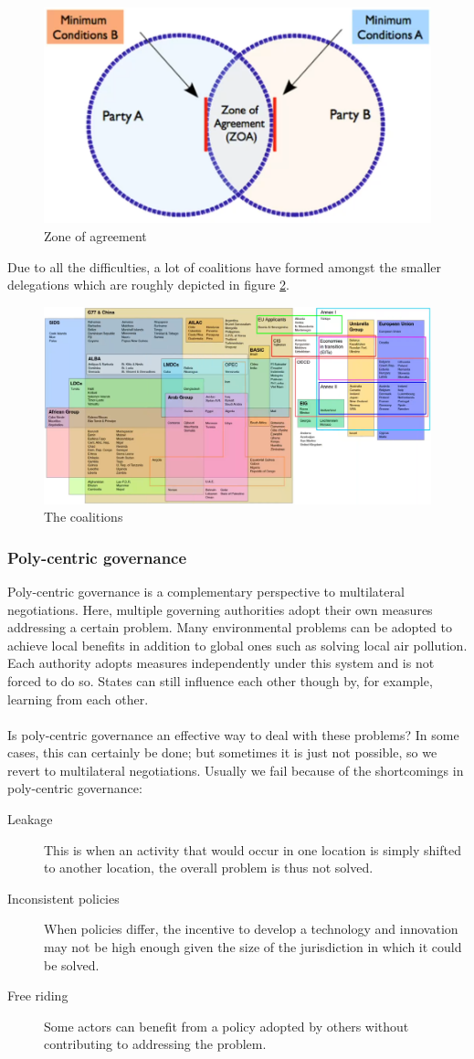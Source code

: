 \documentclass[../summary.tex]{subfiles}
\begin{document}
			\begin{figure}[h]
				\centering
				\includegraphics[width=0.4\linewidth]{../images/13-ZOA.png}
				\caption{Zone of agreement}
				\label{fig:13-ZOA}
			\end{figure}
			Due to all the difficulties, a lot of coalitions have formed amongst the smaller delegations which are roughly depicted in figure \ref{fig:13-coalitions}.
			\begin{figure}[h]
				\centering
				\includegraphics[width=0.7\linewidth]{../images/13-coalitions.png}
				\caption{The coalitions}
				\label{fig:13-coalitions}
			\end{figure}
		
		\subsubsection{Poly-centric governance}
			Poly-centric governance is a complementary perspective to multilateral negotiations. Here, multiple governing authorities adopt their own measures addressing a certain problem. Many environmental problems can be adopted to achieve local benefits in addition to global ones such as solving local air pollution. Each authority adopts measures independently under this system and is not forced to do so. States can still influence each other though by, for example, learning from each other. \\
			\\
			 Is poly-centric governance an effective way to deal with these problems? In some cases, this can certainly be done; but sometimes it is just not possible, so we revert to multilateral negotiations. Usually we fail because of the shortcomings in poly-centric governance:
			 \begin{description}
			 	\item[Leakage] This is when an activity that would occur in one location is simply shifted to another location, the overall problem is thus not solved.
			 	\item[Inconsistent policies] When policies differ, the incentive to develop a technology and innovation may not be high enough given the size of the jurisdiction in which it could be solved. 
			 	\item[Free riding] Some actors can benefit from a policy adopted by others without contributing to addressing the problem.
			 \end{description}
\end{document}
